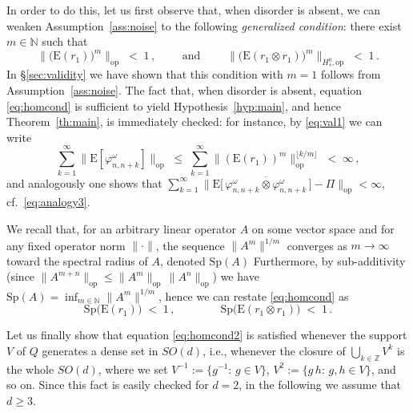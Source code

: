 \documentclass[a4paper,reqno,11pt]{amsart}
\numberwithin{equation}{section}
\newcommand{\go}{\omega}
\DeclareMathOperator*{\union}{\bigcup}       %
\newcommand{\Z}{\mathbb{Z}}
\newcommand{\N}{\mathbb{N}}
\def\bE{\ensuremath{\bs{\mathrm{E}}}}
\def\bs{\boldsymbol}
\renewcommand{\phi}{\varphi}
\begin{document}
In order to do this, let us first observe that,
when disorder is absent, we can weaken Assumption~\ref{ass:noise}
to the following {\sl generalized condition}: there exist $m \in \N$ such that
\begin{equation} \label{eq:homcond}
	\big\| \big( \bE(r_1) \big)^m \big\|_{\text{op}} \;<\; 1 \,, \qquad
	\text{ and }\qquad
	\big\| \big( \bE(r_1 \otimes r_1) \big)^m \big\|_{H^0_s, \text{op}} \;<\; 1 \,.
\end{equation}
In \S\ref{sec:validity} we have shown that
this condition with $m=1$ follows from Assumption~\ref{ass:noise}.
The fact that, when disorder is absent, equation \eqref{eq:homcond} is sufficient
to yield Hypothesis~\ref{hyp:main}, and hence Theorem~\ref{th:main}, is immediately
checked: for instance, by \eqref{eq:val1} we can write
\begin{equation}
	\sum_{k=1}^\infty \big\| \bE[\phi^\go_{n,n+k}] \big\|_{\text{op}}
	\;\le\; \sum_{k=1}^\infty \big\| (\bE( r_1 ))^m \big\|_{\text{op}}^{\lfloor k/m \rfloor}
	\;<\; \infty\,,
\end{equation}
and analogously one shows that
$\sum_{k=1}^\infty \big\|
\bE\big[\,\overline{\phi^\go_{n,n+k} \otimes \phi^\go_{n,n+k}}\,\big]
- \Pi \big\|_{\text{op}} < \infty$, cf.~\eqref{eq:analogy3}.

We recall that, for an arbitrary linear operator $A$
on some vector space and for any fixed operator norm $\| \cdot \|$,
the sequence $\| A^m \|^{1/m}$ converges as $m \to \infty$
toward the spectral radius of $A$, denoted $\text{Sp}(A)$
Furthermore, by sub-additivity
(since $\|A^{m+n}\|_{\text{op}} \le \|A^m\|_{\text{op}} \, \|A^n\|_{\text{op}}$)
we have
$\text{Sp}(A) =
\inf_{m \in \N} \| A^m \|^{1/m}$, hence we can restate \eqref{eq:homcond} as
\begin{equation} \label{eq:homcond2}
	\text{Sp}\big( \bE(r_1) \big) \;<\; 1 \,, \qquad \qquad
	\text{Sp}\big( \bE(r_1 \otimes r_1) \big) \;<\; 1 \,.
\end{equation}

\smallskip

Let us finally show that equation \eqref{eq:homcond2} is satisfied whenever
the support $V$ of $Q$ generates a dense set in $SO(d)$, i.e., whenever
the closure of $\union_{k \in \Z} V^k$ is the whole $SO(d)$,
where we set $V^{-1} := \{g^{-1}: \, g \in V\}$, $V^2 := \{g \, h: \, g,h \in V\}$,
and so on. Since this fact is easily checked for $d=2$,
in the following we assume that $d \ge 3$.
\end{document}
